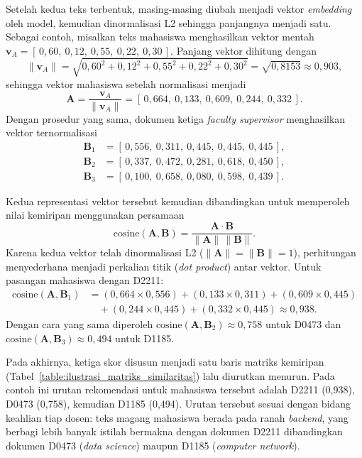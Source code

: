 Setelah kedua teks terbentuk, masing-masing diubah menjadi vektor \textit{embedding} oleh model, kemudian dinormalisasi L2 sehingga panjangnya menjadi satu. Sebagai contoh, misalkan teks mahasiswa menghasilkan vektor mentah $\mathbf{v}_A = [\,0{,}60,\ 0{,}12,\ 0{,}55,\ 0{,}22,\ 0{,}30\,]$. Panjang vektor dihitung dengan
\[
\lVert \mathbf{v}_A \rVert = \sqrt{0{,}60^2 + 0{,}12^2 + 0{,}55^2 + 0{,}22^2 + 0{,}30^2} = \sqrt{0{,}8153} \approx 0{,}903,
\]
sehingga vektor mahasiswa setelah normalisasi menjadi
\[
\mathbf{A} = \frac{\mathbf{v}_A}{\lVert \mathbf{v}_A \rVert} = [\,0{,}664,\ 0{,}133,\ 0{,}609,\ 0{,}244,\ 0{,}332\,].
\]
Dengan prosedur yang sama, dokumen ketiga \textit{faculty supervisor} menghasilkan vektor ternormalisasi
\[
\begin{aligned}
\mathbf{B}_{1} &= [\,0{,}556,\ 0{,}311,\ 0{,}445,\ 0{,}445,\ 0{,}445\,], \\
\mathbf{B}_{2} &= [\,0{,}337,\ 0{,}472,\ 0{,}281,\ 0{,}618,\ 0{,}450\,], \\
\mathbf{B}_{3} &= [\,0{,}100,\ 0{,}658,\ 0{,}080,\ 0{,}598,\ 0{,}439\,].
\end{aligned}
\]

Kedua representasi vektor tersebut kemudian dibandingkan untuk memperoleh nilai kemiripan menggunakan persamaan
\[
\text{cosine}(\mathbf{A}, \mathbf{B}) = \frac{\mathbf{A} \cdot \mathbf{B}}{\lVert \mathbf{A} \rVert \, \lVert \mathbf{B} \rVert}.
\]
Karena kedua vektor telah dinormalisasi L2 ($\lVert \mathbf{A} \rVert = \lVert \mathbf{B} \rVert = 1$), perhitungan menyederhana menjadi perkalian titik (\textit{dot product}) antar vektor. Untuk pasangan mahasiswa dengan D2211:
\begin{align*}
\text{cosine}(\mathbf{A}, \mathbf{B}_{1}) &= (0{,}664 \times 0{,}556) + (0{,}133 \times 0{,}311) + (0{,}609 \times 0{,}445) \\
&\quad + (0{,}244 \times 0{,}445) + (0{,}332 \times 0{,}445) \approx 0{,}938.
\end{align*}
Dengan cara yang sama diperoleh $\text{cosine}(\mathbf{A}, \mathbf{B}_{2}) \approx 0{,}758$ untuk D0473 dan $\text{cosine}(\mathbf{A}, \mathbf{B}_{3}) \approx 0{,}494$ untuk D1185.

Pada akhirnya, ketiga skor disusun menjadi satu baris matriks kemiripan (Tabel~\ref{table:ilustrasi_matriks_similaritas}) lalu diurutkan menurun. Pada contoh ini urutan rekomendasi untuk mahasiswa tersebut adalah D2211 (0{,}938), D0473 (0{,}758), kemudian D1185 (0{,}494). Urutan tersebut sesuai dengan bidang keahlian tiap dosen: teks magang mahasiswa berada pada ranah \textit{backend}, yang berbagi lebih banyak istilah bermakna dengan dokumen D2211 dibandingkan dokumen D0473 (\textit{data science}) maupun D1185 (\textit{computer network}).

